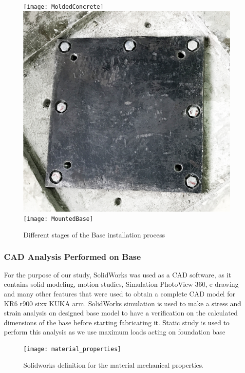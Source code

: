 \begin{figure}[H]
\begin{center}
\texttt{[image: MoldedConcrete]}	
\includegraphics[scale=0.065]{FirstFlange}
\texttt{[image: MountedBase]}
\caption{Different stages of the Base installation process}
\end{center}
\end{figure}


\subsubsection{CAD Analysis Performed on Base}
For the purpose of our study, SolidWorks was used as a CAD software, as it contains solid modeling, motion studies, Simulation PhotoView 360, e-drawing and many other features that were used to obtain a complete CAD model for KR6 r900 sixx KUKA arm. 
\newline SolidWorks simulation is used to make a stress and strain analysis on designed base model to have a verification on the calculated dimensions of the base before starting fabricating it. Static study is used to perform this analysis as we use maximum loads acting on foundation base 


\begin{figure}[H]
	\centering
	\texttt{[image: material\_properties]}
	\caption{Solidworks definition for the material mechanical properties.}
\end{figure}



